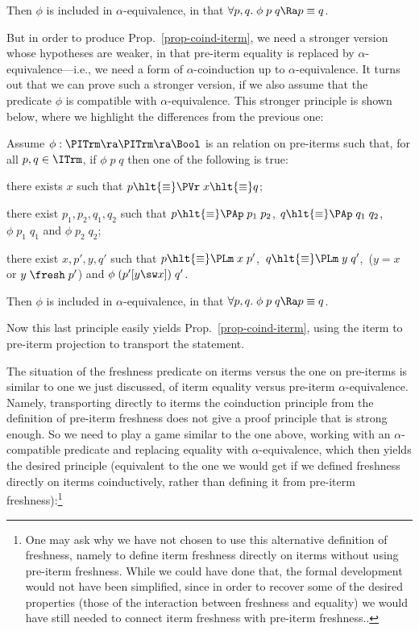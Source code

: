 	Then $\phi$ is included in $\alpha$-equivalence, in that 
	$\forall p,q.\;\phi\;p\;q \Ra p \equiv q$.
\medskip

But in order to produce Prop.~\ref{prop-coind-iterm}, we need a stronger version whose hypotheses are weaker, in that pre-iterm equality is replaced by $\alpha$-equivalence---i.e., we need a form of $\alpha$-coinduction up to $\alpha$-equivalence. It turns out that we can prove such a stronger version, if we also assume that the predicate $\phi$ is compatible with $\alpha$-equivalence. This stronger principle is shown below, where we highlight the differences from the previous one: 
%

	Assume $\phi : \PITrm \ra \PITrm \ra \Bool$ is an  relation on pre-iterms 	
	such that, for all $p,q\in\ITrm$, if $\phi\;p\;q$ then one of the following is true: 
\begin{mmmyitem} 
	\item there exists $x$ such that $p \hlt{\equiv} \PVr\;x \hlt{\equiv} q$; 
	\item there exist $p_1,p_2,q_1,q_2$ such that 
	$p \hlt{\equiv} \PAp\;p_1\;p_2$, $q \hlt{\equiv} \PAp\;q_1\;q_2$, \,$\phi\;p_1\;q_1$ and $\phi\;p_2\;q_2$; 
	\item there exist $x,p',y,q'$ such that 
	$p \hlt{\equiv} \PLm\;x\;p'$, \,$q \hlt{\equiv} \PLm\;y\;q'$, 
	\,($y  = x$ or $y\;\fresh\;p'$) and 
	$\phi\;(p'[y\sw x])\;q'$. 
\end{mmmyitem} 
%

Then $\phi$ is included in $\alpha$-equivalence, in that 
$\forall p,q.\;\phi\;p\;q \Ra p \equiv q$.
\medskip

Now this last principle %
easily yields Prop.~\ref{prop-coind-iterm}, using the iterm to pre-iterm projection to transport the statement. 

\medskip 
The situation of the freshness predicate on iterms versus the one on pre-iterms is similar  
to one we just discussed, of iterm equality versus pre-iterm $\alpha$-equivalence. Namely, transporting directly to iterms the coinduction principle from the definition of pre-iterm freshness does not give a proof principle that is strong enough. So we need to play a game similar to the one above, working with an $\alpha$-compatible predicate and replacing equality with $\alpha$-equivalence, which then yields the desired principle (equivalent to the one we would get if we defined freshness directly on iterms coinductively, rather than defining it from pre-iterm freshness):\footnote{One may ask why we have not chosen to use this alternative definition of freshness, namely to define iterm freshness directly on iterms without using pre-iterm freshness. While we could have done that, the formal development would not have been simplified, since in order to recover some of the desired properties (those of the interaction between freshness and equality) we would have still needed to 
	connect iterm freshness with pre-iterm freshness..} 

